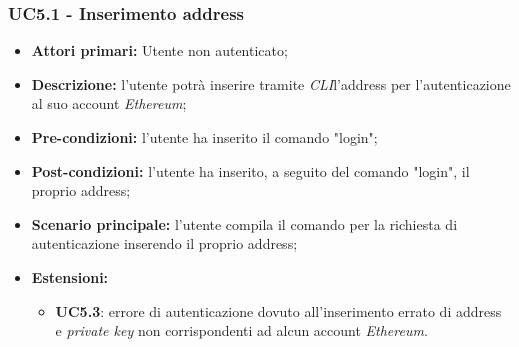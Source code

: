 \subsubsection{UC5.1 - Inserimento address}
\begin{itemize}
	\item \textbf{Attori primari:} Utente non autenticato;
	\item \textbf{Descrizione:} l'utente potrà inserire tramite \textit{CLI\glos}l'address per l'autenticazione al suo account \textit{Ethereum\glos}; 
	\item \textbf{Pre-condizioni:} l'utente ha inserito il comando "login";
	\item \textbf{Post-condizioni:} l'utente ha inserito, a seguito del comando "login", il proprio address;
	\item \textbf{Scenario principale:} l'utente compila il comando per la richiesta di autenticazione inserendo il proprio address;
	\item \textbf{Estensioni:} 
	\begin{itemize}
		\item \textbf{UC5.3}: errore di autenticazione dovuto all'inserimento errato di address e \textit{private key\glo} non corrispondenti ad alcun account \textit{Ethereum\glos}.
	\end{itemize}
\end{itemize}